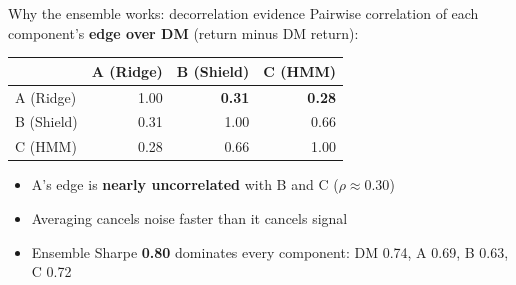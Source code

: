 \documentclass[aspectratio=169, 11pt]{beamer}
\newcommand{\emphp}[1]{{\color{inertiapurple}\textbf{#1}}}
\begin{document}
\begin{frame}{Why the ensemble works: decorrelation evidence}
  \vspace{4pt}
  Pairwise correlation of each component's \textbf{edge over DM} (return minus DM return):
  \vspace{12pt}
  \begin{center}
  \small
  \begin{tabular}{l r r r}
    \toprule
     & \textbf{A (Ridge)} & \textbf{B (Shield)} & \textbf{C (HMM)} \\
    \midrule
    A (Ridge)  & 1.00 & \emphp{0.31} & \emphp{0.28} \\
    B (Shield) & 0.31 & 1.00 & 0.66 \\
    C (HMM)    & 0.28 & 0.66 & 1.00 \\
    \bottomrule
  \end{tabular}
  \end{center}
  \vspace{18pt}
  \begin{itemize}
    \item A's edge is \emphp{nearly uncorrelated} with B and C ($\rho \approx 0.30$)
    \item Averaging cancels noise faster than it cancels signal
    \item Ensemble Sharpe \textbf{0.80} dominates every component: DM 0.74, A 0.69, B 0.63, C 0.72
  \end{itemize}
\end{frame}
\end{document}
